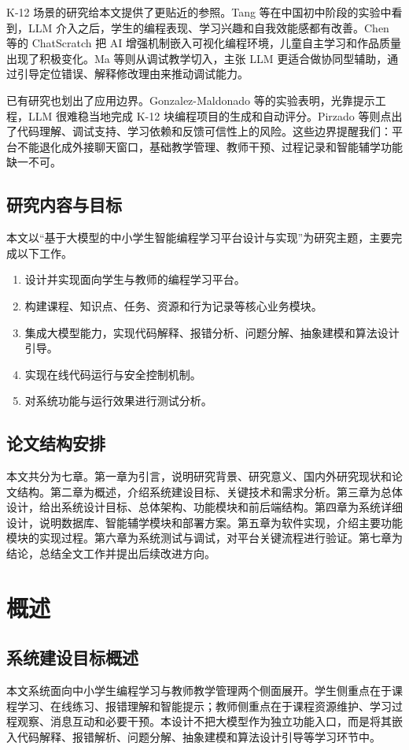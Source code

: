 K-12 场景的研究给本文提供了更贴近的参照。Tang 等在中国初中阶段的实验中看到，LLM 介入之后，学生的编程表现、学习兴趣和自我效能感都有改善\cite{tang2025middleschool}。Chen 等的 ChatScratch 把 AI 增强机制嵌入可视化编程环境，儿童自主学习和作品质量出现了积极变化\cite{chen2024chatscratch}。Ma 等则从调试教学切入，主张 LLM 更适合做协同型辅助，通过引导定位错误、解释修改理由来推动调试能力\cite{ma2024teachableagent}。

已有研究也划出了应用边界。Gonzalez-Maldonado 等的实验表明，光靠提示工程，LLM 很难稳当地完成 K-12 块编程项目的生成和自动评分\cite{gonzalez2025k12gpt}。Pirzado 等则点出了代码理解、调试支持、学习依赖和反馈可信性上的风险\cite{pirzado2024pitfalls}。这些边界提醒我们：平台不能退化成外接聊天窗口，基础教学管理、教师干预、过程记录和智能辅学功能缺一不可。

\section{研究内容与目标}
本文以“基于大模型的中小学生智能编程学习平台设计与实现”为研究主题，主要完成以下工作。
\begin{enumerate}
  \item 设计并实现面向学生与教师的编程学习平台。
  \item 构建课程、知识点、任务、资源和行为记录等核心业务模块。
  \item 集成大模型能力，实现代码解释、报错分析、问题分解、抽象建模和算法设计引导。
  \item 实现在线代码运行与安全控制机制。
  \item 对系统功能与运行效果进行测试分析。
\end{enumerate}

\section{论文结构安排}
本文共分为七章。第一章为引言，说明研究背景、研究意义、国内外研究现状和论文结构。第二章为概述，介绍系统建设目标、关键技术和需求分析。第三章为总体设计，给出系统设计目标、总体架构、功能模块和前后端结构。第四章为系统详细设计，说明数据库、智能辅学模块和部署方案。第五章为软件实现，介绍主要功能模块的实现过程。第六章为系统测试与调试，对平台关键流程进行验证。第七章为结论，总结全文工作并提出后续改进方向。


\chapter{概述}

\section{系统建设目标概述}
本文系统面向中小学生编程学习与教师教学管理两个侧面展开。学生侧重点在于课程学习、在线练习、报错理解和智能提示；教师侧重点在于课程资源维护、学习过程观察、消息互动和必要干预。本设计不把大模型作为独立功能入口，而是将其嵌入代码解释、报错解析、问题分解、抽象建模和算法设计引导等学习环节中。

